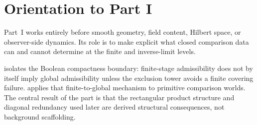 \chapter*{Orientation to Part I}
\label{part:intro-foundations}
\begin{chapterorientation}
\end{chapterorientation}

Part~I works entirely before smooth geometry, field content, Hilbert
space, or observer-side dynamics.  Its role is to make explicit what
closed comparison data can and cannot determine at the finite and
inverse-limit levels.

 isolates the Boolean compactness boundary:
finite-stage admissibility does not by itself imply global
admissibility unless the exclusion tower avoids a finite covering
failure.   applies that finite-to-global mechanism to
primitive comparison worlds.  The central result of the part is that the
rectangular product structure and diagonal redundancy used later are
derived structural consequences, not background scaffolding.
